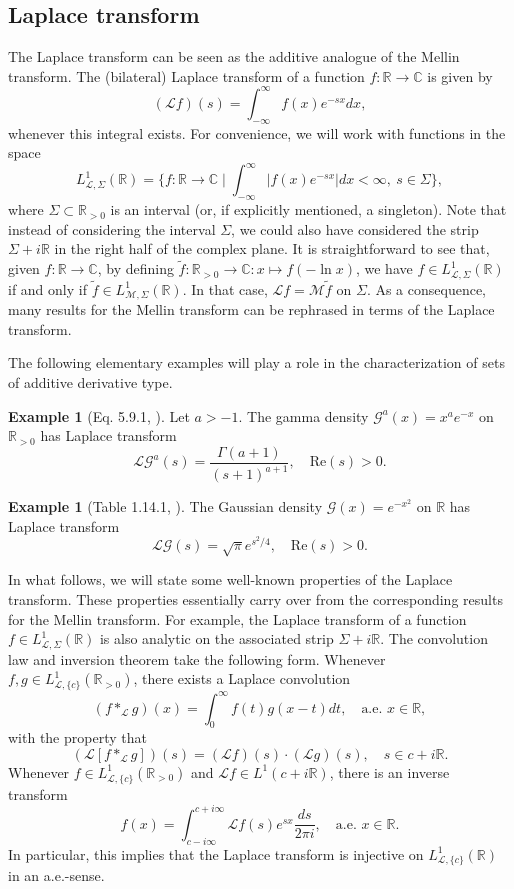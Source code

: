 \documentclass[a4paper,12pt,oneside]{article}
\theoremstyle{definition}
\newtheorem{ex}[defi]{Example}
\newcommand{\C}{\mathbb{C}}
\newcommand{\R}{\mathbb{R}}
\newcommand{\MT}[1]{\mathcal{M}#1}
\newcommand{\LT}[1]{\mathcal{L}#1}
\begin{document}
\subsection{Laplace transform} \label{PRELIM_A}

The Laplace transform can be seen as the additive analogue of the Mellin transform. The (bilateral) Laplace transform of a function $f:\R\to\C$ is given by 
    $$(\mathcal{L} f)(s) = \int_{-\infty}^\infty f(x) e^{-sx} dx, $$
whenever this integral exists. For convenience, we will work with functions in the space
$$ L_{\LT{},\Sigma}^{1}(\R) = \{ f:\R\to\C \mid \int_{-\infty}^{\infty} |f(x)e^{-sx}| dx < \infty,\ s\in\Sigma  \}, $$
where $\Sigma\subset\R_{>0}$ is an interval (or, if explicitly mentioned, a singleton). Note that instead of considering the interval $\Sigma$, we could also have considered the strip $\Sigma+i\R$ in the right half of the complex plane. It is straightforward to see that, given $f:\R\to\C$, by defining $\tilde{f}: \R_{>0}\to\C:x\mapsto f(-\ln x)$, we have $f\in L_{\LT{},\Sigma}^{1}(\R)$ if and only if $\tilde{f}\in L_{\MT{},\Sigma}^{1}(\R)$. In that case, $\LT{f}=\MT{\tilde{f}}$ on $\Sigma$. As a consequence, many results for the Mellin transform can be rephrased in terms of the Laplace transform.
\medbreak

The following elementary examples will play a role in the characterization of sets of additive derivative type.

\begin{ex}[Eq. 5.9.1, \cite{DLMF}] \label{ADT_GAMMA}
Let $a>-1$. The gamma density $ \mathcal{G}^a(x) = x^a e^{-x}$ on $\R_{>0}$ has Laplace transform
    $$\LT{\mathcal{G}^a}(s) = \frac{\Gamma(a+1)}{(s+1)^{a+1}},\quad \text{Re}(s)>0.$$
\end{ex}

\begin{ex} [Table 1.14.1, \cite{DLMF}] \label{ADT_GAUSSIAN}
The Gaussian density $\mathcal{G}(x) = e^{-x^2}$ on $\R$ has Laplace transform
    $$\LT{\mathcal{G}}(s) = \sqrt{\pi} e^{s^2/4},\quad \text{Re}(s)>0.$$
\end{ex}

In what follows, we will state some well-known properties of the Laplace transform. These properties essentially carry over from the corresponding results for the Mellin transform. For example, the Laplace transform of a function $f\in L_{\LT{},\Sigma}^{1}(\R)$ is also analytic on the associated strip $\Sigma+i\R$. The convolution law and inversion theorem take the following form. Whenever $f,g\in L_{\LT{},\{c\}}^{1}(\R_{>0})$, there exists a Laplace convolution
    $$(f\ast_{\mathcal{L}} g)(x) = \int_{0}^\infty f(t) g(x-t) dt,\quad \text{a.e. } x\in\R,$$
with the property that
    $$ (\LT{[f\ast_{\mathcal{L}} g]})(s) = (\LT{f})(s) \cdot (\LT{g})(s),\quad s\in c+i\R. $$
Whenever $f\in L_{\LT{},\{c\}}^{1}(\R_{>0})$ and $\LT{f}\in L^1(c+i\R)$, there is an inverse transform
    $$ f(x) = \int_{c-i\infty}^{c+i\infty} \LT{f}(s) e^{sx} \frac{ds}{2\pi i},\quad \text{a.e. } x\in\R.  $$
In particular, this implies that the Laplace transform is injective on $L_{\LT{},\{c\}}^{1}(\R)$ in an a.e.-sense.
\medbreak
\end{document}
